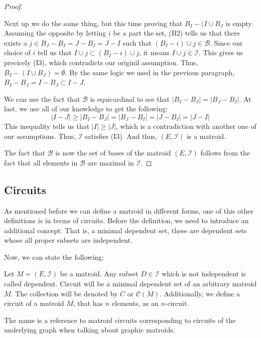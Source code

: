 \begin{proof}
\begin{enumerate}
        Next up we do the same thing, but this time proving that $B_I-(I\cup B_J$ is empty. Assuming the opposite by letting $i$ be a part the set, (B2) tells us that there exists a $j\in B_J-B_I=J-B_I=J-I$ such that $(B_I-i)\cup j\in\mathcal{B}$. Since our choice of $i$ tell us that $I\cup j\subset (B_I-i)\cup j$, it means $I\cup j\in\mathcal{I}$. This gives us precicely (I3), which contradicts our originil assumption. Thus, $B_I-(I\cup B_J)=\emptyset$. By the same logic we used in the previous paragraph, $B_I-B_J=I-B_J\subset I-J$.

        We can use the fact that $\mathcal{B}$ is equicardinal to see that $|B_I-B_J|=|B_J-B_I|$. At last, we use all of our knowledge to get the following:
        $$ |I-J|\geq |B_I-B_J|=|B_J-B_I|=|J-B_I|=|J-I| $$
        This inequality tells us that $|I|\geq |J|$, which is a contradiction with another one of our assumptions. Thus, $\mathcal{I}$ satisfies (I3). And thus, $(E,\mathcal{I})$ is a matroid.
    \end{enumerate}  
    The fact that $\mathcal{B}$ is now the set of bases of the matroid $(E,\mathcal{I})$ follows from the fact that all elements in $\mathcal{B}$ are maximal in $\mathcal{I}$.
\end{proof}





\subsection{Circuits} 
As mentioned before we can define a matroid in different forms, one of this other definitions is in terms of circuits. Before the definition, we need to introduce an additional concept. 
That is, a minimal dependent set, these are dependent sets whose all proper subsets are independent.

Now, we can state the following:
\begin{defn}
Let $M = (E, \mathcal{I})$ be a matroid. Any subset $D \in \mathcal{I}$ which is not independent is called dependent. Circuit will be a minimal dependent set of an arbitrary matroid $M$. The collection will be denoted by $C$ or $\mathcal{C}(M)$. Additionally, we define a circuit of a matroid $M$, that has $n$ elements, as an $n$-circuit.
\end{defn}

The name is a reference to matroid circuits corresponding to circuits of the underlying graph when talking about graphic matroids.

